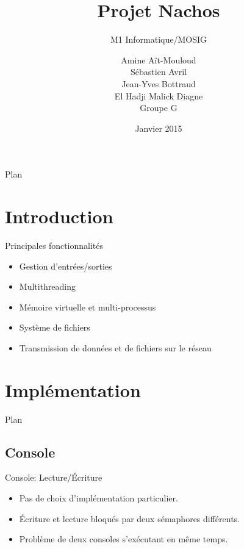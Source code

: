 \documentclass{beamer}
\title{Projet Nachos}
\subtitle{M1 Informatique/MOSIG}
\author{Amine Aït-Mouloud
\\ Sébastien Avril
\\ Jean-Yves Bottraud
\\ El Hadji Malick Diagne
\\ Groupe G
}
\date{Janvier 2015}
\begin{document}

\begin{frame}{Plan}
    \tableofcontents
\end{frame}

\section{Introduction}
\begin{frame}{Principales fonctionnalités}
	\begin{itemize}
       \item Gestion d'entrées/sorties
       \item Multithreading
       \item Mémoire virtuelle et multi-processus
       \item Système de fichiers
       \item Transmission de données et de fichiers sur le réseau
   \end{itemize}
\end{frame}

\section{Implémentation}
\begin{frame}{Plan}
    \tableofcontents[currentsection]
\end{frame}

\subsection{Console}
\begin{frame}{Console: Lecture/Écriture}
   \begin{itemize}
       \item Pas de choix d'implémentation particulier.
       \item Écriture et lecture bloqués par deux sémaphores différents.
       \item Problème de deux consoles s’exécutant en même temps.
   \end{itemize}
\end{frame}
\end{document}
